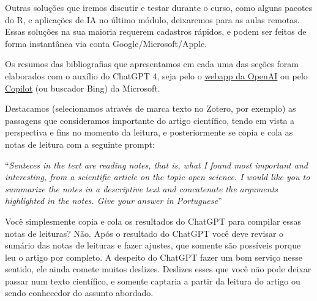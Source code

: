 \documentclass[
  a4paper,
]{book}
\newcounter{quartocallouttipno}
\newcommand{\quartocallouttip}[1]{\refstepcounter{quartocallouttipno}\label{#1}}
\begin{document}
Outras soluções que iremos discutir e testar durante o curso, como
alguns pacotes do R, e aplicações de IA no último módulo, deixaremos
para as aulas remotas. Essas soluções na sua maioria requerem cadastros
rápidos, e podem ser feitos de forma instantânea via conta
Google/Microsoft/Apple.

\begin{tcolorbox}[enhanced jigsaw, colback=white, coltitle=black, bottomrule=.15mm, rightrule=.15mm, title=\textcolor{quarto-callout-important-color}{\faExclamation}\hspace{0.5em}{Importante \ref*{tip-prompt}: ChatGPT para suas notas de leituras}, colframe=quarto-callout-important-color-frame, titlerule=0mm, bottomtitle=1mm, toptitle=1mm, opacityback=0, arc=.35mm, toprule=.15mm, opacitybacktitle=0.6, left=2mm, leftrule=.75mm, breakable, colbacktitle=quarto-callout-important-color!10!white]

\quartocallouttip{tip-prompt} 

Os resumos das bibliografias que apresentamos em cada uma das seções
foram elaborados com o auxílio do ChatGPT 4, seja pelo o
\href{https://chat.openai.com/}{webapp da OpenAI} ou pelo
\href{https://copilot.microsoft.com/}{Copilot} (ou buscador Bing) da
Microsoft.\vspace{0.5em}

Destacamos (selecionamos através de marca texto no Zotero, por exemplo)
as passagens que consideramos importante do artigo científico, tendo em
vista a perspectiva e fins no momento da leitura, e posteriormente se
copia e cola as notas de leitura com a seguinte prompt:\vspace{0.5em}

``\emph{Senteces in the text are reading notes, that is, what I found
most important and interesting, from a scientific article on the topic
open science. I would like you to summarize the notes in a descriptive
text and concatenate the arguments highlighted in the notes. Give your
answer in Portuguese}''

\end{tcolorbox}

\begin{tcolorbox}[enhanced jigsaw, colback=white, coltitle=black, bottomrule=.15mm, rightrule=.15mm, title=\textcolor{quarto-callout-caution-color}{\faFire}\hspace{0.5em}{Não confie cegamente na IA}, colframe=quarto-callout-caution-color-frame, titlerule=0mm, bottomtitle=1mm, toptitle=1mm, opacityback=0, arc=.35mm, toprule=.15mm, opacitybacktitle=0.6, left=2mm, leftrule=.75mm, breakable, colbacktitle=quarto-callout-caution-color!10!white]

Você simplesmente copia e cola os resultados do ChatGPT para compilar
essas notas de leituras? Não. Após o resultado do ChatGPT você deve
revisar o sumário das notas de leituras e fazer ajustes, que somente são
possíveis porque leu o artigo por completo. A despeito do ChatGPT fazer
um bom serviço nesse sentido, ele ainda comete muitos deslizes. Deslizes
esses que você não pode deixar passar num texto científico, e somente
captaria a partir da leitura do artigo ou sendo conhecedor do assunto
abordado.

\end{tcolorbox}
\end{document}
